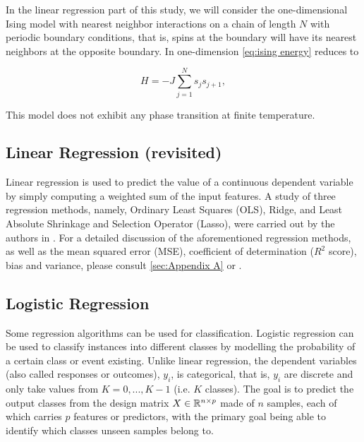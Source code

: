 In the linear regression part of this study, we will consider the one-dimensional Ising model with nearest neighbor interactions on a chain of length $N$ with periodic boundary conditions, that is, spins at the boundary will have its nearest neighbors at the opposite boundary. In one-dimension \autoref{eq:ising energy} reduces to 

\begin{equation}\label{eq:ising 1D energy}
    H  = - J \sum_{j=1}^N s_j s_{j+1},
\end{equation}

This model does not exhibit any phase transition at finite temperature.



\subsection{Linear Regression (revisited)}\label{sec:linreg theory}
Linear regression is used to predict the value of a continuous dependent variable by simply computing a weighted sum of the input features. A study of three regression methods, namely, Ordinary Least Squares (OLS), Ridge, and Least Absolute Shrinkage and Selection Operator (Lasso), were carried out by the authors in \cite{PROJone}. For a detailed discussion of the aforementioned regression methods, as well as the mean squared error (MSE), coefficient of determination ($R^2$ score), bias and variance, please consult \autoref{sec:Appendix A} or \cite{PROJone}.

\subsection{Logistic Regression}\label{sec:logreg theory}
Some regression algorithms can be used for classification. Logistic regression can be used to classify instances into different classes by modelling the probability of a certain class or event existing. Unlike linear regression, the dependent  variables (also called responses or outcomes), $y_i$, is categorical, that is, $y_i$ are discrete and only take values from $K=0, ..., K-1$ (i.e. $K$ classes). The goal is to predict the output classes from the design matrix $X \in \mathbb{R}^{n\times p}$ made of $n$ samples, each of which carries $p$ features or predictors, with the primary goal being able to identify which classes unseen samples belong to. \cite{logreglec} \cite{Hands-onML}

